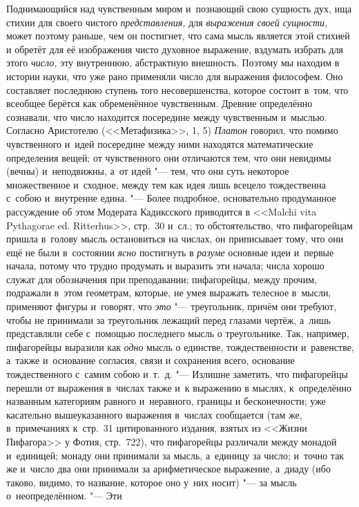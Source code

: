 Поднимающийся над чувственным миром и~познающий свою сущность дух, ища стихии
для своего чистого {\em представления,} для {\em выражения своей сущности,}
может поэтому раньше, чем он постигнет, что сама мысль является этой стихией и
обретёт для её изображения чисто духовное выражение, вздумать избрать для этого
{\em число,} эту внутреннюю, абстрактную внешность. Поэтому мы находим в
истории науки, что уже рано применяли число для выражения философем. Оно
составляет последнюю ступень того несовершенства, которое состоит в~том, что
всеобщее берётся как обременённое чувственным. Древние определённо сознавали,
что число находится посередине между чувственным и~мыслью. Согласно Аристотелю
(<<Метафизика>>, 1, 5) {\em Платон} говорил, что помимо чувственного и~идей
посередине между ними находятся математические определения вещей; от
чувственного они отличаются тем, что они невидимы (вечны) и~неподвижны, а~от
идей "--- тем, что они суть некоторое множественное и~сходное, между тем как
идея лишь всецело тождественна с~собою и~внутренне едина. "--- Более
подробное, основательно продуманное рассуждение об этом Модерата Кадиксского
приводится в <<Malchi vita Pythagorae ed. Ritterhus>>, стр.~30 и~сл.; то
обстоятельство, что пифагорейцам пришла в~голову мысль остановиться на числах,
он приписывает тому, что они ещё не были в~состоянии {\em ясно} постигнуть в
{\em разуме} основные идеи и~первые начала, потому что трудно продумать и
выразить эти начала; числа хорошо служат для обозначения при преподавании;
пифагорейцы, между прочим, подражали в~этом геометрам, которые, не умея
выражать телесное в~мысли, применяют фигуры и~говорят, что {\em это} "---
треугольник, причём они требуют, чтобы не принимали за треугольник лежащий
перед глазами чертёж, а~лишь представляли себе с~помощью последнего мысль о
треугольнике. Так, например, пифагорейцы выразили как {\em одно} мысль о
единстве, тождественности и~равенстве, а~также и~основание согласия, связи и
сохранения всего, основание тождественного с~самим собою и~т.~д. "--- Излишне
заметить, что пифагорейцы перешли от выражения в~числах также и~к выражению в
мыслях, к~определённо названным категориям равного и~неравного, границы и
бесконечности; уже касательно вышеуказанного выражения в~числах сообщается (там
же, в~примечаниях к~стр.~31 цитированного издания, взятых из <<Жизни Пифагора>>
у Фотия, стр.~722), что пифагорейцы различали между монадой и~единицей; монаду
они принимали за мысль, а~единицу за число; и~точно так же и~число два они
принимали за арифметическое выражение, а~диаду (ибо таково, видимо, то
название, которое оно у~них носит) "--- за мысль о~неопределённом. "--- Эти
